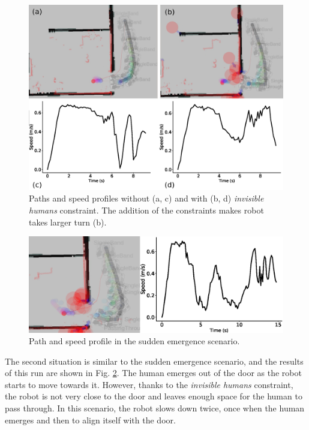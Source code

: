 \begin{figure}[h!]
    \centering
    \includegraphics[width=0.9\columnwidth]{images/chapter5/real_compare_new}
    \caption{Paths and speed profiles without (a, c) and with (b, d) \textit{invisible humans} constraint. The addition of the constraints makes robot takes larger turn (b).}
    \label{fig:real_plots}
\end{figure}
\begin{figure}[h!]
\centering
\includegraphics[width=0.9\columnwidth]{images/chapter5/move_final_fig.png}
\caption{Path and speed profile in the sudden emergence scenario.}
\label{fig:real_move_plots}
\end{figure} 

The second situation is similar to the sudden emergence scenario, and the results of this run are shown in Fig. \ref{fig:real_move_plots}. The human emerges out of the door as the robot starts to move towards it. However, thanks to the \textit{invisible humans} constraint, the robot is not very close to the door and leaves enough space for the human to pass through. In this scenario, the robot slows down twice, once when the human emerges and then to align itself with the door. 

